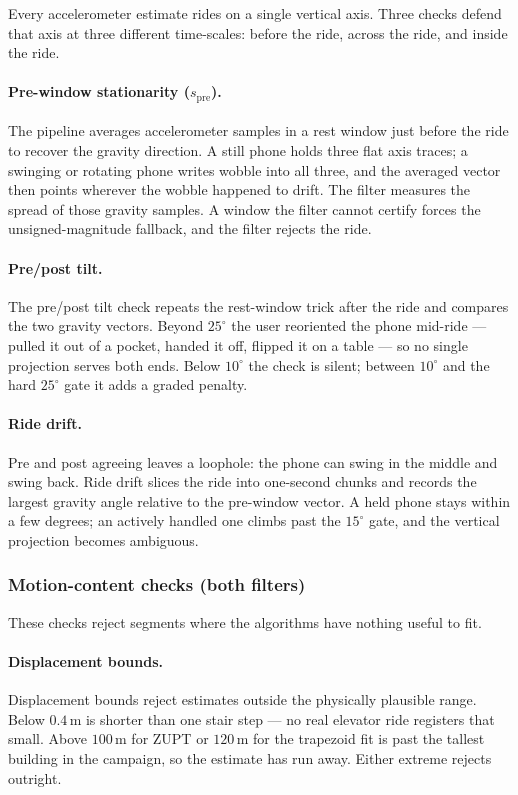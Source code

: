 \documentclass[manuscript,review,screen]{acmart}
\begin{document}
Every accelerometer estimate rides on a single vertical axis.  Three
checks defend that axis at three different time-scales: before the
ride, across the ride, and inside the ride.

\paragraph{Pre-window stationarity ($s_{\mathrm{pre}}$).}
The pipeline averages accelerometer samples in a rest window just
before the ride to recover the gravity direction.  A still phone
holds three flat axis traces; a swinging or rotating phone writes
wobble into all three, and the averaged vector then points wherever
the wobble happened to drift.  The filter measures the spread of
those gravity samples.  A window the filter cannot certify forces
the unsigned-magnitude fallback, and the filter rejects the ride.

\paragraph{Pre/post tilt.}
The pre/post tilt check repeats the rest-window trick after the ride
and compares the two gravity vectors.  Beyond $25^{\circ}$ the user
reoriented the phone mid-ride --- pulled it out of a pocket, handed
it off, flipped it on a table --- so no single projection serves both
ends.  Below $10^{\circ}$ the check is silent; between $10^{\circ}$
and the hard $25^{\circ}$ gate it adds a graded penalty.

\paragraph{Ride drift.}
Pre and post agreeing leaves a loophole: the phone can swing in the
middle and swing back.  Ride drift slices the ride into one-second
chunks and records the largest gravity angle relative to the
pre-window vector.  A held phone stays within a few degrees; an
actively handled one climbs past the $15^{\circ}$ gate, and the
vertical projection becomes ambiguous.

\subsubsection*{Motion-content checks (both filters)}

These checks reject segments where the algorithms have nothing useful
to fit.

\paragraph{Displacement bounds.}
Displacement bounds reject estimates outside the physically plausible
range.  Below $0.4\,\mathrm{m}$ is shorter than one stair step --- no
real elevator ride registers that small.  Above $100\,\mathrm{m}$ for
ZUPT or $120\,\mathrm{m}$ for the trapezoid fit is past the tallest
building in the campaign, so the estimate has run away.  Either
extreme rejects outright.
\end{document}
